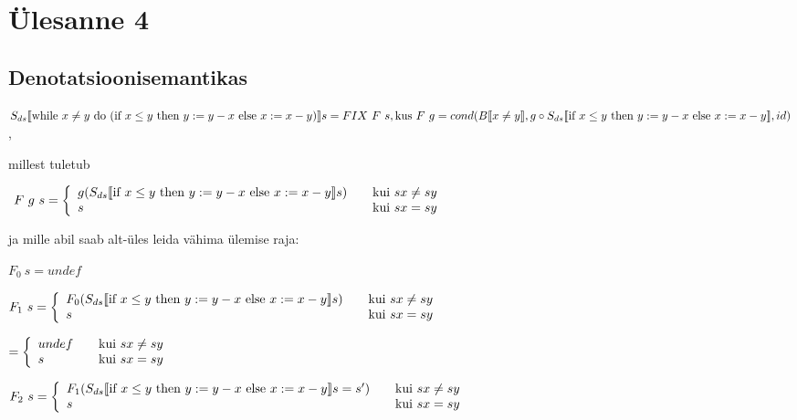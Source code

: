 \section{Ülesanne 4}
\subsection{Denotatsioonisemantikas}

\(
S_{ds} \llbracket
\text{while\ } x \neq y \text{\ do\ }
  (\text{if\ } x \leq y
  \text{\ then\ } y := y - x \text{\ else\ } x := x - y )
\rrbracket s
= FIX \ F \ s,
\\
\text{kus} \ F \  g = cond(B \llbracket x \neq y \rrbracket, 
g \circ S_{ds} \llbracket \text{if\ } x \leq y \text{\ then\ } y := y - x
\text{\ else\ } x := x - y \rrbracket,
id
)
\),

millest tuletub 

\(
  \ F \  g \ s = \left\{
  \begin{array}{l l}
    g(
      S_{ds} \llbracket
        \text{if\ } x \leq y
        \text{\ then\ } y := y - x \text{\ else\ } x := x - y
      \rrbracket s
    ) & \quad \text{kui}\ sx \neq sy \\
    s   & \quad \text{kui}\ sx = sy\\
  \end{array} \right.
\)

ja mille abil saab alt-üles leida vähima ülemise raja:


\(
F_0 \  s = undef
\)


\(
F_1 \  s = \left\{
  \begin{array}{l l}
    F_0(
      S_{ds} \llbracket
        \text{if\ } x \leq y
        \text{\ then\ } y := y - x \text{\ else\ } x := x - y
      \rrbracket s
    ) & \quad \text{kui}\ sx \neq sy \\
    s   & \quad \text{kui}\ sx = sy\\
  \end{array} \right.
\)

\(
= \left\{
  \begin{array}{l l}
    undef & \quad \text{kui}\ sx \neq sy \\
    s   & \quad \text{kui}\ sx = sy\\
  \end{array} \right.
\)

\(
F_2 \ s = \left\{
    \begin{array}{l l}
    F_1(
      S_{ds} \llbracket
        \text{if\ } x \leq y
        \text{\ then\ } y := y - x \text{\ else\ } x := x - y
      \rrbracket s = s'
    ) & \quad \text{kui}\ sx \neq sy \\
    s   & \quad \text{kui}\ sx = sy\\
  \end{array} \right.
\)

